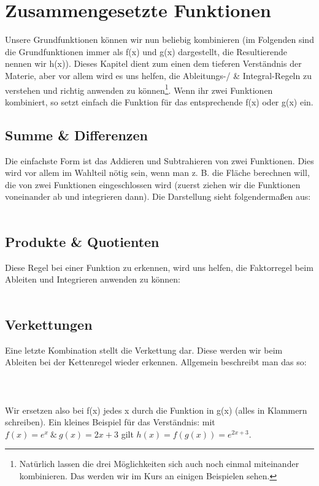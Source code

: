 \section{Zusammengesetzte Funktionen}
	Unsere Grundfunktionen können wir nun beliebig kombinieren (im Folgenden sind
	die Grundfunktionen immer als f(x) und g(x) dargestellt, die Resultierende
	nennen wir h(x)). Dieses Kapitel dient zum einen dem tieferen Verständnis der
	Materie, aber vor allem wird es uns helfen, die Ableitungs-/ \& Integral-Regeln
	zu verstehen und richtig anwenden zu können\footnote{Natürlich lassen die drei
	Möglichkeiten sich auch noch einmal miteinander kombinieren. Das werden wir im
	Kurs an einigen Beispielen sehen.}. Wenn ihr zwei Funktionen kombiniert, so
	setzt einfach die Funktion für das entsprechende f(x) oder g(x) ein.

	\subsection{Summe \& Differenzen}
		Die einfachste Form ist das Addieren und Subtrahieren von zwei Funktionen.
		Dies wird vor allem im Wahlteil nötig sein, wenn man z. B. die Fläche
		berechnen will, die von zwei Funktionen eingeschlossen wird (zuerst ziehen wir
		die Funktionen voneinander ab und integrieren dann). Die Darstellung sieht
		folgendermaßen aus:
		\\ \\
		\formel{\[h_1(x)=f(x)+g(x), \mathrm{\ bzw\ } h_2(x)=f(x)-g(x)\]}
		
	
	\subsection{Produkte \& Quotienten}
		Diese Regel bei einer Funktion zu erkennen, wird uns helfen, die Faktorregel
		beim Ableiten und Integrieren anwenden zu können:
		\\ \\
		\formel{\[h_1(x)=f(x)\cdot g(x), \mathrm{\ bzw\ } h_2(x)=\frac{f(x)}{g(x)}\]}
		

	\subsection{Verkettungen}
		Eine letzte Kombination stellt die Verkettung dar. Diese werden wir beim
		Ableiten bei der Kettenregel wieder erkennen. Allgemein beschreibt man das so:
		\\ \\
		\formel{\[h(x)=f(g(x))\]}
		\\ \\
		Wir ersetzen also bei f(x) jedes x durch die Funktion in g(x) (alles in
		Klammern schreiben). Ein kleines Beispiel für das Verständnis: mit \(f(x)=e^x\
		\&\ g(x)=2x+3\) gilt \(h(x)=f(g(x))=e^{2x+3}\).
		
